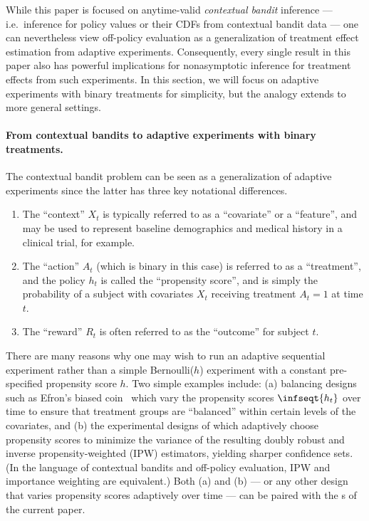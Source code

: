 While this paper is focused on anytime-valid \emph{contextual bandit} inference --- i.e.~inference for policy values or their CDFs from contextual bandit data --- one can nevertheless view off-policy evaluation as a generalization of treatment effect estimation from adaptive experiments. Consequently, every single result in this paper also has powerful implications for nonasymptotic inference for treatment effects from such experiments. In this section, we will focus on adaptive experiments with binary treatments for simplicity, but the analogy extends to more general settings.

\paragraph{From contextual bandits to adaptive experiments with binary treatments.} The contextual bandit problem can be seen as a generalization of adaptive experiments since the latter has three key notational differences. 
\begin{enumerate}
\item The ``context'' $X_t$ is typically referred to as a ``covariate'' or a ``feature'', and may be used to represent baseline demographics and medical history in a clinical trial, for example.
\item The ``action'' $A_t$ (which is binary in this case) is referred to as a ``treatment'', and the policy $h_t$ is called the ``propensity score'', and is simply the probability of a subject with covariates $X_t$ receiving treatment $A_t = 1$ at time $t$.
\item The ``reward'' $R_t$ is often referred to as the ``outcome'' for subject $t$.
\end{enumerate}
There are many reasons why one may wish to run an adaptive sequential experiment rather than a simple Bernoulli($h$) experiment with a constant pre-specified propensity score $h$. Two simple examples include: (a) balancing designs such as Efron's biased coin~\citep{efron1971forcing} which vary the propensity scores $\infseqt{h_t}$ over time to ensure that treatment groups are ``balanced'' within certain levels of the covariates, and (b) the experimental designs of \citet{kato2020adaptive} which adaptively choose propensity scores to minimize the variance of the resulting doubly robust and inverse propensity-weighted (IPW) estimators, yielding sharper confidence sets. (In the language of contextual bandits and off-policy evaluation, IPW and importance weighting are equivalent.) Both (a) and (b) --- or any other design that varies propensity scores adaptively over time --- can be paired with the \cs{}s of the current paper.

